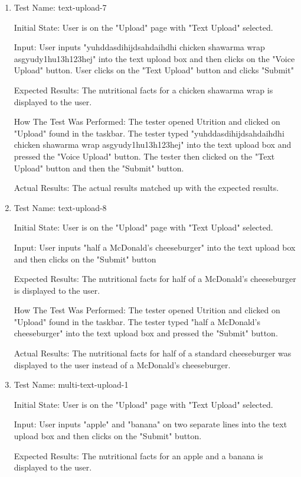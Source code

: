 \documentclass[12pt, titlepage]{article}
\begin{document}
\begin{enumerate}
		\item{Test Name: text-upload-7}
		
		Initial State: User is on the "Upload" page with "Text Upload" selected.
		
		Input: User inputs "yuhddasdihijdsahdaihdhi chicken shawarma wrap asgyudy1hu13h123hej" into the text upload box and then clicks on the "Voice Upload" button. User clicks on the "Text Upload" button and clicks "Submit"
		
		Expected Results: The nutritional facts for a chicken shawarma wrap is displayed to the user.
		
		How The Test Was Performed: The tester opened Utrition and clicked on "Upload" found in the taskbar. The tester typed "yuhddasdihijdsahdaihdhi chicken shawarma wrap asgyudy1hu13h123hej" into the text upload box and pressed the "Voice Upload" button. The tester then clicked on the "Text Upload" button and then the "Submit" button.
		
		Actual Results: The actual results matched up with the expected results.
		
		\item{Test Name: text-upload-8}
		
		Initial State: User is on the "Upload" page with "Text Upload" selected.
		
		Input: User inputs "half a McDonald's cheeseburger" into the text upload box and then clicks on the "Submit" button
		
		Expected Results: The nutritional facts for half of a McDonald's cheeseburger is displayed to the user.
		
		How The Test Was Performed: The tester opened Utrition and clicked on "Upload" found in the taskbar. The tester typed "half a McDonald's cheeseburger" into the text upload box and pressed the "Submit" button.
		
		Actual Results: The nutritional facts for half of a standard cheeseburger was displayed to the user instead of a McDonald's cheeseburger.
		
		\item{Test Name: multi-text-upload-1}
		
		Initial State: User is on the "Upload" page with "Text Upload" selected.
		
		Input: User inputs "apple" and "banana" on two separate lines into the text upload box and then clicks on the "Submit" button.
		
		Expected Results: The nutritional facts for an apple and a banana is displayed to the user.
		

\end{enumerate}
\end{document}
